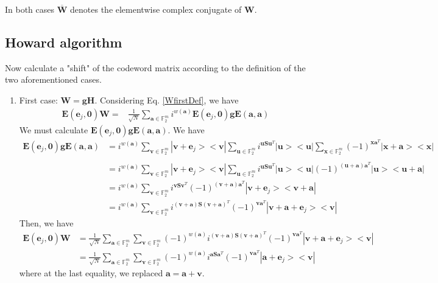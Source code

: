 \documentclass{article}
\begin{document}
In both cases $\overline{\mathbf{W}}$ denotes the elementwise complex conjugate of $\mathbf{W}$.

	\subsection*{Howard algorithm}
	Now calculate a "shift" of the codeword matrix according to the definition of the two aforementioned cases.
	\begin{enumerate}
		\item First case: $\mathbf{W=gH}$. Considering Eq. \ref{WfirstDef}, we have
		\begin{align*}
			\mathbf{E}(\mathbf{e}_j, \mathbf{0})\mathbf{W} = &\frac{1}{\sqrt{N}} \sum_{\mathbf{a} \in \mathbb{F}^m_2} i^{w(\mathbf{a})}\mathbf{E}(\mathbf{e}_j,\mathbf{0})\mathbf{g}\mathbf{E}(\mathbf{a},\mathbf{a}) 
		\end{align*}
		We must calculate $\mathbf{E}(\mathbf{e}_j,\mathbf{0})\mathbf{g}\mathbf{E}(\mathbf{a},\mathbf{a})$. We have
		\begin{align*}
			\mathbf{E}(\mathbf{e}_j,\mathbf{0})\mathbf{g}\mathbf{E}(\mathbf{a},\mathbf{a})& = 	i^{w(\mathbf{a})}  \sum_{\mathbf{v} \in \mathbb{F}_2^m}{ |\mathbf{v}+\mathbf{e}_j><\mathbf{v}|}  \sum_{\mathbf{u} \in \mathbb{F}_2^m}{i^{\mathbf{u S}\mathbf{u}^T} |\mathbf{u}><\mathbf{u}|}\sum_{\mathbf{x} \in \mathbb{F}_2^m}{ (-1)^{\mathbf{x}\mathbf{a}^T}|\mathbf{x+a}><\mathbf{x}|} \\
			\\
			&= i^{w(\mathbf{a})}  \sum_{\mathbf{v} \in \mathbb{F}_2^m}{ |\mathbf{v}+\mathbf{e}_j><\mathbf{v}|}  \sum_{\mathbf{u} \in \mathbb{F}_2^m}{i^{\mathbf{u S}\mathbf{u}^T} |\mathbf{u}><\mathbf{u}|} (-1)^{(\mathbf{u+a})\mathbf{a}^T}|\mathbf{u}><\mathbf{u+a}| \\
			&= i^{w(\mathbf{a})} \sum_{\mathbf{v} \in \mathbb{F}_2^m}{i^{\mathbf{v}\mathbf{S}\mathbf{v}^T}(-1)^{(\mathbf{v+a})\mathbf{a}^T} |\mathbf{v}+\mathbf{e}_j><\mathbf{v+a}|} \\
			& = i^{w(\mathbf{a})} \sum_{\mathbf{v} \in \mathbb{F}_2^m}{i^{(\mathbf{v+a})\mathbf{S}(\mathbf{v+a})^T}(-1)^{\mathbf{v}\mathbf{a}^T} |\mathbf{v+a}+\mathbf{e}_j><\mathbf{v}|}
		\end{align*}
		Then, we have
		\begin{align*}
			\mathbf{E}(\mathbf{e}_j, \mathbf{0})\mathbf{W} &= \frac{1}{\sqrt{N}}  \sum_{\mathbf{a} \in \mathbb{F}_2^m}{\sum_{\mathbf{v} \in \mathbb{F}_2^m}{ (-1)^{w(\mathbf{a})} i^{(\mathbf{v+a})\mathbf{S}(\mathbf{v+a})^T}(-1)^{\mathbf{v}\mathbf{a}^T} |\mathbf{v+a}+\mathbf{e}_j><\mathbf{v}|}}\\
			& = \frac{1}{\sqrt{N}}  \sum_{\mathbf{a} \in \mathbb{F}_2^m}{\sum_{\mathbf{v} \in \mathbb{F}_2^m}{ (-1)^{w(\mathbf{a})} i^{\mathbf{a}\mathbf{S}\mathbf{a}^T}(-1)^{\mathbf{v}\mathbf{a}^T} |\mathbf{a}+\mathbf{e}_j><\mathbf{v}|}}
		\end{align*}
		where at the last equality, we replaced $\mathbf{a=a+v}$. 
		

\end{enumerate}
\end{document}
